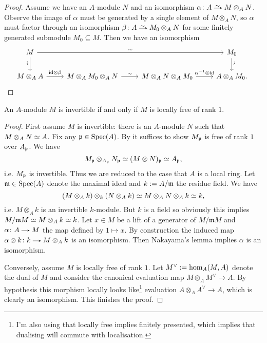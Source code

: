 \begin{proof}
  Assume we have an $A$-module $N$ and an isomorphism $\alpha \c A
  \isoto M \otimes_A N$. Observe the image of $\alpha$ must be
  generated by a single element of $M \otimes_A N$, so $\alpha$ must
  factor through an isomorphism $\beta \c A \isoto M_0 \otimes_A N$
  for some finitely generated submodule $M_0 \subseteq M$. Then we
  have an isomorphism
  \[
  \hspace{-4pt}
  \begin{tikzcd}
    M \ar[d, "\sim"{rotate=90, yshift=3pt, xshift=-4pt}] \ar[rrr,
    "\sim"] & & & M_0 \ar[d, "\sim"{rotate=90, yshift=-4pt,
      xshift=-4pt}] \\ M \otimes_A A \ar[r, "\id \otimes \beta"] & M
    \otimes_A M_0 \otimes_A N \ar[r, "\sim"] & M \otimes_A N \otimes_A
    M_0 \ar[r, "\alpha^{-1} \otimes \id"] & A \otimes_A M_0.
  \end{tikzcd}
  \qedhere
  \]
\end{proof}

\begin{lemma}
  \label{invertible-locally-free}
  An $A$-module $M$ is invertible if and only if $M$ is locally free
  of rank $1$.
\end{lemma}

\newcommand{\m}{\mathfrak{m}}
\begin{proof}
  First assume $M$ is invertible: there is an $A$-module $N$ such that
  $M \otimes_A N \simeq A$. Fix any $\mathfrak{p} \in \operatorname{Spec}(A)$. By
   it suffices to show $M_{\mathfrak{p}}$ is free
  of rank $1$ over $A_{\mathfrak{p}}$. We have
  \[
  M_{\mathfrak{p}} \otimes_{A_{\mathfrak{p}}} N_{\mathfrak{p}} \simeq (M \otimes N)_{\mathfrak{p}} \simeq A_{\mathfrak{p}},
  \]
  i.e. $M_{\mathfrak{p}}$ is invertible. Thus we are reduced to the case that $A$
  is a local ring. Let $\m \in \Spec(A)$ denote the maximal ideal and
  $k \ce A/\m$ the residue field. We have
  \[
  (M \otimes_A k) \otimes_k (N \otimes_A k) \simeq M \otimes_A N
  \otimes_A k \simeq k,
  \]
  i.e. $M \otimes_A k$ is an invertible $k$-module. But $k$ is a field
  so obviously this implies $M/\m M \iso M \otimes_A k \iso k$. Let $x
  \in M$ be a lift of a generator of $M/\m M$ and $\alpha \c A \to M$
  the map defined by $1 \mapsto x$. By construction the induced map
  $\alpha \otimes k \c k \to M \otimes_A k$ is an isomorphism.  Then
  Nakayama's lemma implies $\alpha$ is an isomorphism.

  Conversely, assume $M$ is locally free of rank $1$. Let $M^\vee \mathrel{:=}
  \hom_A(M, A)$ denote the dual of $M$ and consider the canonical
  evaluation map $M \otimes_A M^\vee \to A$. By hypothesis this
  morphism locally looks like\footnote{I'm also using that locally
    free implies finitely presented, which implies that dualising will
    commute with localisation.} evaluation $A \otimes_A A^\vee \to A$,
  which is clearly an isomorphism. This finishes the proof.
\end{proof}

